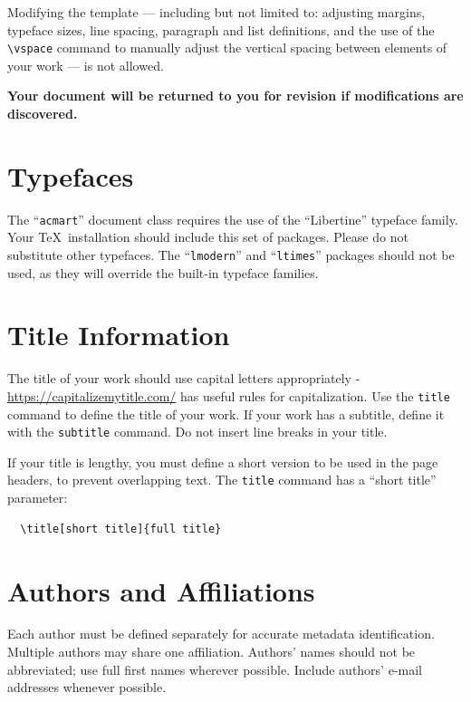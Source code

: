 \documentclass[
acmsmall,
nonacm,
screen,
acmthm]{../templates/acmart}
\begin{document}
Modifying the template --- including but not limited to: adjusting
margins, typeface sizes, line spacing, paragraph and list definitions,
and the use of the \texttt{\textbackslash{}vspace} command to manually
adjust the vertical spacing between elements of your work --- is not
allowed.

\textbf{Your document will be returned to you for revision if
modifications are discovered.}

\hypertarget{typefaces}{%
\section{Typefaces}\label{typefaces}}

The ``\texttt{acmart}'' document class requires the use of the
``Libertine'' typeface family. Your TeX~installation should include this
set of packages. Please do not substitute other typefaces. The
``\texttt{lmodern}'' and ``\texttt{ltimes}'' packages should not be
used, as they will override the built-in typeface families.

\hypertarget{title-information}{%
\section{Title Information}\label{title-information}}

The title of your work should use capital letters appropriately -
\url{https://capitalizemytitle.com/} has useful rules for
capitalization. Use the \texttt{title} command to define the title of
your work. If your work has a subtitle, define it with the
\texttt{subtitle} command. Do not insert line breaks in your title.

If your title is lengthy, you must define a short version to be used in
the page headers, to prevent overlapping text. The \texttt{title}
command has a ``short title'' parameter:

\begin{verbatim}
  \title[short title]{full title}
\end{verbatim}

\hypertarget{authors-and-affiliations}{%
\section{Authors and Affiliations}\label{authors-and-affiliations}}

Each author must be defined separately for accurate metadata
identification. Multiple authors may share one affiliation. Authors'
names should not be abbreviated; use full first names wherever possible.
Include authors' e-mail addresses whenever possible.
\end{document}
